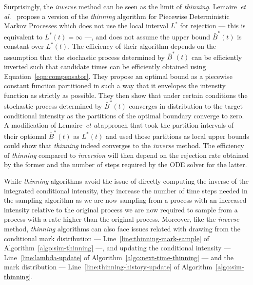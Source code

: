 \documentclass{juliacon}
\numberwithin{equation}{section}
\newcommand{\etal}{\textit{et al}.}
\begin{document}
Surprisingly, the \textit{inverse} method can be seen as the limit of \textit{thinning}. Lemaire~\etal~\cite{lemaire2018} propose a version of the \textit{thinning} algorithm for Piecewise Deterministic Markov Processes which does not use the local interval \( L^\ast \) for rejection --- this is equivalent to \( L^\ast(t) = \infty \) ---, and does not assume the upper bound \( \bar{B}^\ast(t) \) is constant over \( L^\ast(t) \). The efficiency of their algorithm depends on the assumption that the stochastic process determined by \( \bar{B}^\ast(t) \) can be efficiently inverted such that candidate times can be efficiently obtained using Equation~\ref{eqn:compensator}. They propose an optimal bound as a piecewise constant function partitioned in such a way that it envelopes the intensity function as strictly as possible. They then show that under certain conditions the stochastic process determined by \( \bar{B}^\ast(t) \) converges in distribution to the target conditional intensity as the partitions of the optimal boundary converge to zero. A modification of Lemaire~\etal approach that took the partition intervals of their optiomal \( \bar{B}^\ast(t) \) as \( L^\ast(t) \) and used those partitions as local upper bounds could show that \textit{thinning} indeed converges to the \textit{inverse} method. The efficiency of \textit{thinning} compared to \textit{inversion} will then depend on the rejection rate obtained by the former and the number of steps required by the ODE solver for the latter.

While \textit{thinning} algorithms avoid the issue of directly computing the inverse of the integrated conditional intensity, they increase the number of time steps needed in the sampling algorithm as we are now sampling from a process with an increased intensity relative to the original process we are now required to sample from a process with a rate higher than the original process. Moreover, like the \textit{inverse} method, \textit{thinning} algorithms can also face issues related with drawing from the conditional mark distribution --- Line~\ref{line:thinning-mark-sample} of Algorithm~\ref{algo:sim-thinning} ---, and updating the conditional intensity --- Line~\ref{line:lambda-update} of Algorithm~\ref{algo:next-time-thinning} --- and the mark distribution --- Line~\ref{line:thinning-history-update} of Algorithm~\ref{algo:sim-thinning}.
\end{document}
